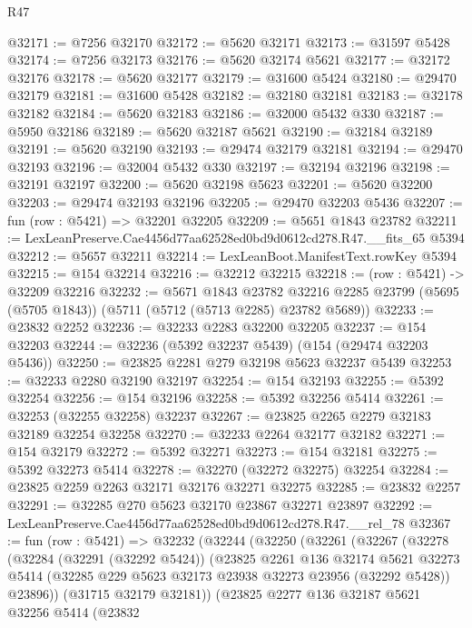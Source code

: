 \begin{lexlean}{R47}
\begin{coremodule}
@32171 := @7256 @32170
@32172 := @5620 @32171
@32173 := @31597 @5428
@32174 := @7256 @32173
@32176 := @5620 @32174 @5621
@32177 := @32172 @32176
@32178 := @5620 @32177
@32179 := @31600 @5424
@32180 := @29470 @32179
@32181 := @31600 @5428
@32182 := @32180 @32181
@32183 := @32178 @32182
@32184 := @5620 @32183
@32186 := @32000 @5432 @330
@32187 := @5950 @32186
@32189 := @5620 @32187 @5621
@32190 := @32184 @32189
@32191 := @5620 @32190
@32193 := @29474 @32179 @32181
@32194 := @29470 @32193
@32196 := @32004 @5432 @330
@32197 := @32194 @32196
@32198 := @32191 @32197
@32200 := @5620 @32198 @5623
@32201 := @5620 @32200
@32203 := @29474 @32193 @32196
@32205 := @29470 @32203 @5436
@32207 := fun (row : @5421) => @32201 @32205
@32209 := @5651 @1843 @23782
@32211 := LexLeanPreserve.Cae4456d77aa62528ed0bd9d0612cd278.R47.__fits_65 @5394
@32212 := @5657 @32211
@32214 := LexLeanBoot.ManifestText.rowKey @5394
@32215 := @154 @32214
@32216 := @32212 @32215
@32218 := (row : @5421) -> @32209 @32216
@32232 := @5671
    @1843
    @23782
    @32216
    @2285
    @23799
    (@5695 (@5705 @1843))
    (@5711 (@5712 (@5713 @2285) @23782 @5689))
@32233 := @23832 @2252
@32236 := @32233 @2283 @32200 @32205
@32237 := @154 @32203
@32244 := @32236 (@5392 @32237 @5439) (@154 (@29474 @32203 @5436))
@32250 := @23825 @2281 @279 @32198 @5623 @32237 @5439
@32253 := @32233 @2280 @32190 @32197
@32254 := @154 @32193
@32255 := @5392 @32254
@32256 := @154 @32196
@32258 := @5392 @32256 @5414
@32261 := @32253 (@32255 @32258) @32237
@32267 := @23825 @2265 @2279 @32183 @32189 @32254 @32258
@32270 := @32233 @2264 @32177 @32182
@32271 := @154 @32179
@32272 := @5392 @32271
@32273 := @154 @32181
@32275 := @5392 @32273 @5414
@32278 := @32270 (@32272 @32275) @32254
@32284 := @23825 @2259 @2263 @32171 @32176 @32271 @32275
@32285 := @23832 @2257
@32291 := @32285 @270 @5623 @32170 @23867 @32271 @23897
@32292 := LexLeanPreserve.Cae4456d77aa62528ed0bd9d0612cd278.R47.__rel_78
@32367 := fun (row : @5421) =>
  @32232
    (@32244
      (@32250
        (@32261
          (@32267
            (@32278
              (@32284
                (@32291 (@32292 @5424))
                (@23825
                  @2261
                  @136
                  @32174
                  @5621
                  @32273
                  @5414
                  (@32285 @229 @5623 @32173 @23938 @32273 @23956 (@32292 @5428))
                  @23896))
              (@31715 @32179 @32181))
            (@23825
              @2277
              @136
              @32187
              @5621
              @32256
              @5414
              (@23832

\end{coremodule}
\end{lexlean}
